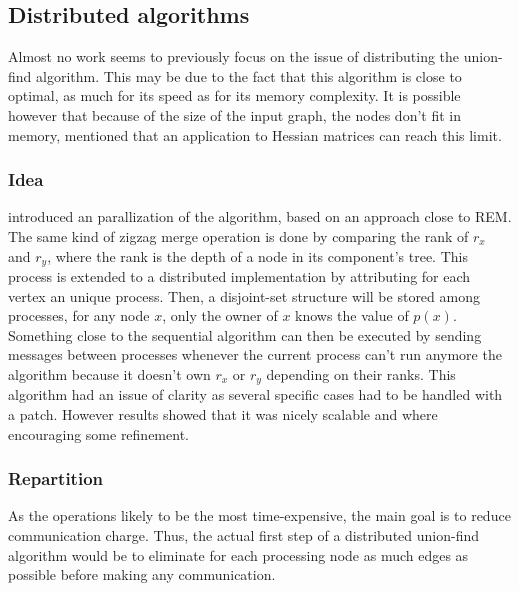 \documentclass[12px]{article}
\begin{document}
    \subsection{Distributed algorithms}
      Almost no work seems to previously focus on the issue of distributing the union-find algorithm.
      This may be due to the fact that this algorithm is close to optimal, as much for its speed as for its memory complexity.
      It is possible however that because of the size of the input graph, the nodes don't fit in memory,  mentioned that an application to Hessian matrices can reach this limit.

      \subsubsection{Idea}
         introduced an parallization of the algorithm, based on an approach close to REM\@.
        The same kind of zigzag merge operation is done by comparing the rank of $r_x$ and $r_y$, where the rank is the depth of a node in its component's tree.
        This process is extended to a distributed implementation by attributing for each vertex an unique process. Then, a disjoint-set structure will be stored among processes, for any node $x$, only the owner of $x$ knows the value of $p(x)$.
        Something close to the sequential algorithm can then be executed by sending messages between processes whenever the current process can't run anymore the algorithm because it doesn't own $r_x$ or $r_y$ depending on their ranks.
      This algorithm had an issue of clarity as several specific cases had to be handled with a patch. However results showed that it was nicely scalable and where encouraging some refinement.

      \subsubsection{Repartition}
        As the operations likely to be the most time-expensive, the main goal is to reduce communication charge.
        Thus, the actual first step of a distributed union-find algorithm would be to eliminate for each processing node as much edges as possible before making any communication.
\end{document}
